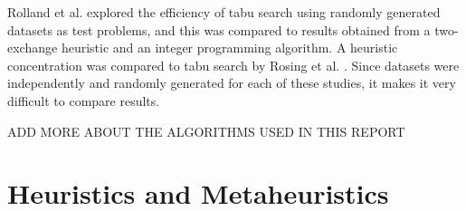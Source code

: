 \documentclass[11pt]{article}
\begin{document}
	Rolland et al. \cite{ROLL97} explored the efficiency of tabu search using randomly generated datasets as test problems, and this was compared to results obtained from a two-exchange heuristic and an integer programming algorithm.  A heuristic concentration was compared to tabu search by Rosing et al. \cite{ROSI98}.  Since datasets were independently and randomly generated for each of these studies, it makes it very difficult to compare results.
	
	ADD MORE ABOUT THE ALGORITHMS USED IN THIS REPORT
	
	\section{Heuristics and Metaheuristics}
	
\end{document}
